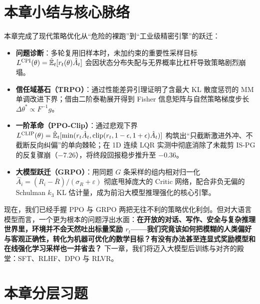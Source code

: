 \section*{本章小结与核心脉络}

本章完成了现代策略优化从“危险的裸跑”到“工业级精密引擎”的跃迁：
\begin{itemize}
  \item \textbf{问题诊断}：多轮复用旧样本时，未加约束的重要性采样目标 $L^{\mathrm{CPI}}(\theta) = \hat{\mathbb{E}}_t[r_t(\theta)\hat{A}_t]$ 会因状态分布失配与无界概率比杠杆导致策略剧烈崩塌。
  \item \textbf{信任域基石（TRPO）}：通过性能差异引理证明了含最大 KL 散度惩罚的 MM 单调改进下界；借由二阶泰勒展开得到 Fisher 信息矩阵与自然策略梯度步长 $\Delta\theta^* \propto F^{-1} g$。
  \item \textbf{一阶革命（PPO-Clip）}：通过悲观下界 $L^{\mathrm{CLIP}}(\theta) = \hat{\mathbb{E}}_t[\min(r_t\hat{A}_t, \operatorname{clip}(r_t, 1-\epsilon, 1+\epsilon)\hat{A}_t)]$ 构筑出“只截断激进外冲、不截断反向纠偏”的单向棘轮；在 1D 连续 LQR 实测中彻底消除了未裁剪 IS-PG 的反复骤崩（$-7.26$），将终段回报稳步推升至 $-0.36$。
  \item \textbf{大模型跃迁（GRPO）}：用同题 $G$ 条采样的组内相对归一化 $\hat{A}_i = (R_i - \bar{R})/(\sigma_R + \varepsilon)$ 彻底甩掉庞大的 Critic 网络，配合非负无偏的 Schulman $k_3$ KL 估计量，成为前沿大模型推理强化的核心引擎。
\end{itemize}

现在，我们已经手握 PPO 与 GRPO 两把无往不利的策略优化利剑。但对大语言模型而言，一个更为根本的问题浮出水面：\textbf{在开放的对话、写作、安全与复杂推理世界里，环境并不会天然吐出标量奖励 $r_t$——我们究竟该如何把模糊的人类偏好与客观正确性，转化为机器可优化的数学目标？有没有办法甚至连显式奖励模型和在线强化学习采样也一并省去？} 下一章，我们将迈入大模型后训练与对齐的殿堂：SFT、RLHF、DPO 与 RLVR。

\section*{本章分层习题}


